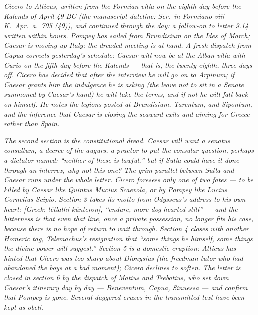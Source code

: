 
\textit{Cicero to Atticus, written from the Formian villa
on the eighth day before the Kalends of April 49 BC
(the manuscript dateline: \textit{Scr.\ in Formiano viii
K.\ Apr.\ a.\ 705 (49)}), and continued through the day:
a follow-on to letter 9.14 written within hours. Pompey has
sailed from Brundisium on the Ides of March; Caesar is
moving up Italy; the dreaded meeting is at hand. A fresh
dispatch from Capua corrects yesterday's schedule:
Caesar will now be at the Alban villa with Curio on the
fifth day before the Kalends --- that is, the
twenty-eighth, three days off. Cicero has decided that
after the interview he will go on to Arpinum; if Caesar
grants him the indulgence he is asking (the leave not to
sit in a Senate summoned by Caesar's hand) he will take
the terms, and if not he will fall back on himself. He
notes the legions posted at Brundisium, Tarentum, and
Sipontum, and the inference that Caesar is closing the
seaward exits and aiming for Greece rather than Spain.}

\textit{The second section is the constitutional dread.
Caesar will want a senatus consultum, a decree of the
augurs, a praetor to put the consular question, perhaps
a dictator named: ``neither of these is lawful,'' but if
Sulla could have it done through an interrex, why not
this one? The grim parallel between Sulla and Caesar runs
under the whole letter. Cicero foresees only one of two
fates --- to be killed by Caesar like Quintus Mucius
Scaevola, or by Pompey like Lucius Cornelius Scipio.
Section 3 takes its motto from Odysseus's address to his
own heart: \textit{[Greek: t\'etlathi k\'unteron]},
``endure, more dog-hearted still'' --- and the bitterness
is that even that line, once a private possession, no
longer fits his case, because there is no hope of return
to wait through. Section 4 closes with another Homeric
tag, Telemachus's resignation that ``some things he
himself, some things the divine power will suggest.''
Section 5 is a domestic eruption: Atticus has hinted that
Cicero was too sharp about Dionysius (the freedman tutor
who had abandoned the boys at a bad moment); Cicero
declines to soften. The letter is closed in section 6 by
the dispatch of Matius and Trebatius, who set down
Caesar's itinerary day by day --- Beneventum, Capua,
Sinuessa --- and confirm that Pompey is gone. Several
daggered cruxes in the transmitted text have been kept
as obeli.}
